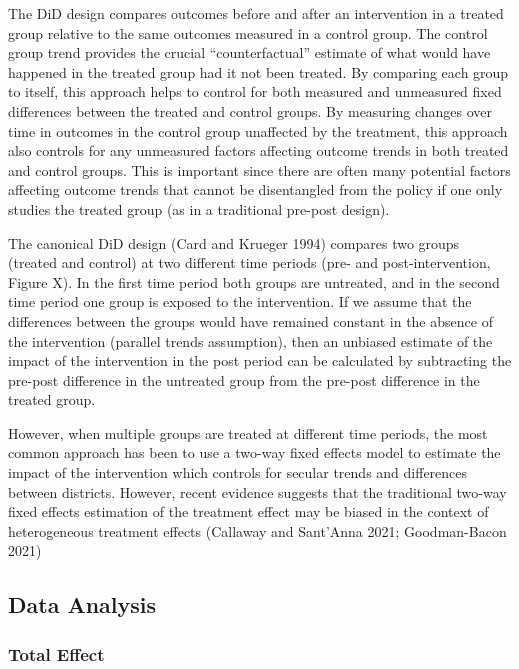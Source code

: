\documentclass[
  letterpaper,
  DIV=11,
  numbers=noendperiod]{scrartcl}
\begin{document}
The DiD design compares outcomes before and after an intervention in a
treated group relative to the same outcomes measured in a control group.
The control group trend provides the crucial ``counterfactual'' estimate
of what would have happened in the treated group had it not been
treated. By comparing each group to itself, this approach helps to
control for both measured and unmeasured fixed differences between the
treated and control groups. By measuring changes over time in outcomes
in the control group unaffected by the treatment, this approach also
controls for any unmeasured factors affecting outcome trends in both
treated and control groups. This is important since there are often many
potential factors affecting outcome trends that cannot be disentangled
from the policy if one only studies the treated group (as in a
traditional pre-post design).

The canonical DiD design (Card and Krueger 1994) compares two groups
(treated and control) at two different time periods (pre- and
post-intervention, Figure X). In the first time period both groups are
untreated, and in the second time period one group is exposed to the
intervention. If we assume that the differences between the groups would
have remained constant in the absence of the intervention (parallel
trends assumption), then an unbiased estimate of the impact of the
intervention in the post period can be calculated by subtracting the
pre-post difference in the untreated group from the pre-post difference
in the treated group.

However, when multiple groups are treated at different time periods, the
most common approach has been to use a two-way fixed effects model to
estimate the impact of the intervention which controls for secular
trends and differences between districts. However, recent evidence
suggests that the traditional two-way fixed effects estimation of the
treatment effect may be biased in the context of heterogeneous treatment
effects (Callaway and Sant'Anna 2021; Goodman-Bacon 2021)

\hypertarget{data-analysis}{%
\subsection{Data Analysis}\label{data-analysis}}

\hypertarget{total-effect}{%
\subsubsection{Total Effect}\label{total-effect}}
\end{document}
